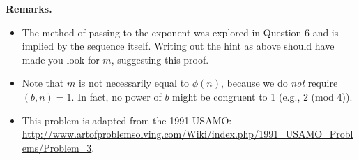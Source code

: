 \documentclass[10pt]{amsart}
\begin{document}
\smallskip

\textbf{Remarks.}
\begin{itemize}
\item The method of passing to the exponent was explored in Question 6 and is implied by the sequence itself. Writing out the hint as above should have made you look for $m$, suggesting this proof.
\item Note that $m$ is not necessarily equal to $\phi(n)$, because we do \emph{not} require $(b,n) = 1$. In fact, no power of $b$ might be congruent to 1 (e.g., 2 (mod 4)).
\item This problem is adapted from the 1991 USAMO: \url{http://www.artofproblemsolving.com/Wiki/index.php/1991_USAMO_Problems/Problem_3}.
\end{itemize}
\end{document}
